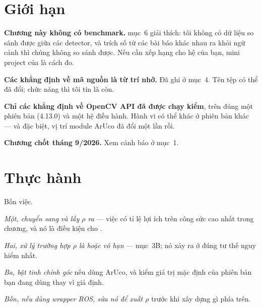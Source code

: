 \documentclass[../../marker.tex]{subfiles}
\begin{document}
\section{Giới hạn}

\textbf{Chương này không có benchmark.}  mục~6 giải thích: tôi không có dữ liệu so sánh được giữa các detector, và trích số từ các bài báo khác nhau ra khỏi ngữ cảnh thì chúng không so sánh được. Nếu cần xếp hạng cho hệ của bạn, mini project của  là cách đo.

\textbf{Các khẳng định về mã nguồn là từ trí nhớ.} Đã ghi ở mục~4. Tên tệp có thể đã đổi; chức năng thì tôi tin là còn.

\textbf{Chỉ các khẳng định về OpenCV API đã được chạy kiểm}, trên đúng một phiên bản (4.13.0) và một hệ điều hành. Hành vi có thể khác ở phiên bản khác --- và đặc biệt, vị trí module ArUco đã đổi một lần rồi.

\textbf{Chương chốt tháng 9/2026.} Xem cảnh báo ở mục~1.

\section{Thực hành}

Bốn việc.

\emph{Một, chuyển sang  và lấy \(\rho\) ra} --- việc có tỉ lệ lợi ích trên công sức cao nhất trong chương, và nó là điều kiện cho .

\emph{Hai, xử lý trường hợp \(\rho\) là  hoặc vô hạn} --- mục~3B; nó xảy ra ở đúng tư thế nguy hiểm nhất.

\emph{Ba, bật tinh chỉnh góc} nếu dùng ArUco, và kiểm giá trị mặc định của phiên bản bạn đang dùng thay vì giả định.

\emph{Bốn, nếu dùng wrapper ROS, sửa nó để xuất \(\rho\)} trước khi xây dựng gì phía trên.
\end{document}
